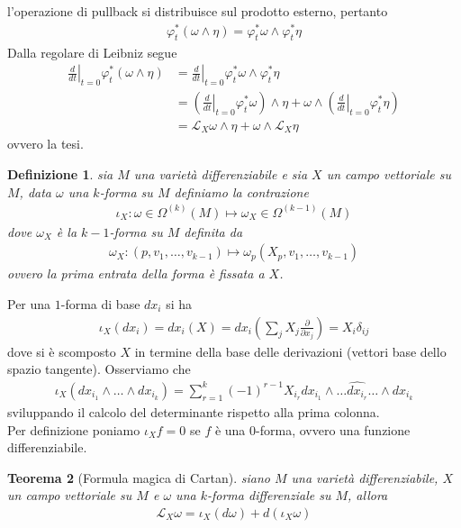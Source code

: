 \documentclass[twoside, 11pt]{amsbook}
\makeatletter
\newcommand{\0}{{(0)}}
\newcommand{\3}{{(3)}}
\theoremstyle{colonplain}
\newtheorem{thm}{Teorema}[chapter]
\theoremstyle{colondefinition}
\newtheorem{defn}[thm]{Definizione}
\theoremstyle{colonremark}
\numberwithin{equation}{chapter}
\renewcommand{\proofname}{Dimostrazione}
\renewenvironment{proof}[1][\proofname]{\par
  \pushQED{\qed}%
  \normalfont \topsep6\p@\@plus6\p@\relax
  \trivlist
  \item[\hskip\labelsep\bfseries #1:]\ignorespaces
}{%
  \popQED\endtrivlist\@endpefalse
}
\makeatother
\begin{document}
\begin{proof} l'operazione di pullback si distribuisce sul prodotto esterno, pertanto
\begin{align}
    \varphi^*_t(\omega \wedge \eta) = \varphi^*_t\omega \wedge \varphi^*_t\eta
\end{align}
Dalla regolare di Leibniz segue
\begin{align}
    \left.\frac{d}{dt}\right|_{t = 0}\varphi^*_t(\omega \wedge \eta) &= \left.\frac{d}{dt}\right|_{t = 0}\varphi^*_t\omega \wedge \varphi^*_t\eta \\
    &= \left(\left.\frac{d}{dt}\right|_{t = 0}\varphi^*_t\omega\right) \wedge \eta + \omega \wedge \left(\left.\frac{d}{dt}\right|_{t = 0} \varphi^*_t\eta\right) \\
    &= \mathcal{L}_X\omega \wedge \eta + \omega \wedge \mathcal{L}_X \eta
\end{align}
ovvero la tesi.
\end{proof}
\begin{defn} sia $M$ una varietà differenziabile e sia $X$ un campo vettoriale su $M$, data $\omega$ una $k$-forma su $M$ definiamo la contrazione
\begin{align}
    \iota_X : \omega \in \Omega^{(k)}(M) \mapsto \omega_X \in \Omega^{(k - 1)}(M)
\end{align}
dove $\omega_X$ è la $k - 1$-forma su $M$ definita da
\begin{align}
    \omega_X : (p, v_1, \dots, v_{k - 1}) \mapsto \omega_p(X_p, v_1, \dots, v_{k - 1})
\end{align}
ovvero la prima entrata della forma è fissata a $X$.
\end{defn}
Per una $1$-forma di base $dx_i$ si ha
\begin{align}
    \iota_X(dx_i) = dx_i(X) = dx_i\left(\sum_j X_j\frac{\partial}{\partial x_j}\right) = X_i\delta_{ij}
\end{align}
dove si è scomposto $X$ in termine della base delle derivazioni (vettori base dello spazio tangente). Osserviamo che
\begin{align}
    \iota_X(dx_{i_1} \wedge \dots \wedge dx_{i_k}) = \sum_{r = 1}^k (-1)^{r - 1}X_{i_r}dx_{i_1} \wedge \dots \widehat{dx_{i_r}} \dots \wedge dx_{i_k}
\end{align}
sviluppando il calcolo del determinante rispetto alla prima colonna. \\
Per definizione poniamo $\iota_X f = 0$ se $f$ è una $0$-forma, ovvero una funzione differenziabile.
\begin{thm}[Formula magica di Cartan]\label{CartanFormula} siano $M$ una varietà differenziabile, $X$ un campo vettoriale su $M$ e $\omega$ una $k$-forma differenziale su $M$, allora
\begin{align}
    \mathcal{L}_X\omega = \iota_X(d\omega) + d(\iota_X \omega)
\end{align}
\end{thm}
\end{document}
